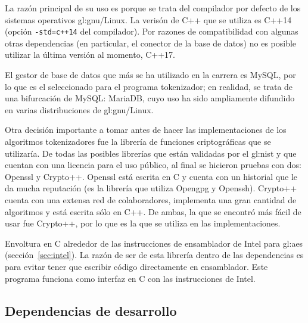 
{%
  La razón principal de su uso es porque se trata del compilador por defecto de
  los sistemas operativos \acrshort{gl:gnu}/Linux. La verisón de C++ que
  se utiliza es C++14 (opción \texttt{-std=c++14} del compilador). Por razones
  de compatibilidad con algunas otras dependencias (en particular, el conector
  de la base de datos) no es posible utilizar la última versión al momento,
  C++17.
}

{%
  El gestor de base de datos que más se ha utilizado en la carrera es MySQL,
  por lo que es el seleccionado para el programa tokenizador; en realidad,
  se trata de una bifurcación de MySQL: MariaDB, cuyo uso ha sido ampliamente
  difundido en varias distribuciones de \acrshort{gl:gnu}/Linux.
}

{%
  Otra decisión importante a tomar antes de hacer las implementaciones de los
  algoritmos tokenizadores fue la librería de funciones criptográficas que
  se utilizaría. De todas las posibles librerías que están validadas
  por el \gls{gl:nist} y que cuentan con una licencia para el uso público, al
  final se hicieron pruebas con dos: Openssl y Crypto++. Openssl está escrita
  en C y cuenta con un historial que le da mucha reputación (es la librería
  que utiliza Opengpg y Openssh). Crypto++ cuenta con una extensa red de
  colaboradores, implementa una gran cantidad de algoritmos y está escrita sólo
  en C++. De ambas, la que se encontró más fácil de usar fue Crypto++, por lo
  que es la que se utiliza en las implementaciones.
}

{%
  Envoltura en C alrededor de las instrucciones de ensamblador de Intel para
  \gls{gl:aes} (sección~\ref{sec:intel}). La razón de ser de esta librería
  dentro de las dependencias es para evitar tener que escribir código
  directamente en ensamblador. Este programa funciona como interfaz en C con las
  instrucciones de Intel.
}

\subsection{Dependencias de desarrollo}

